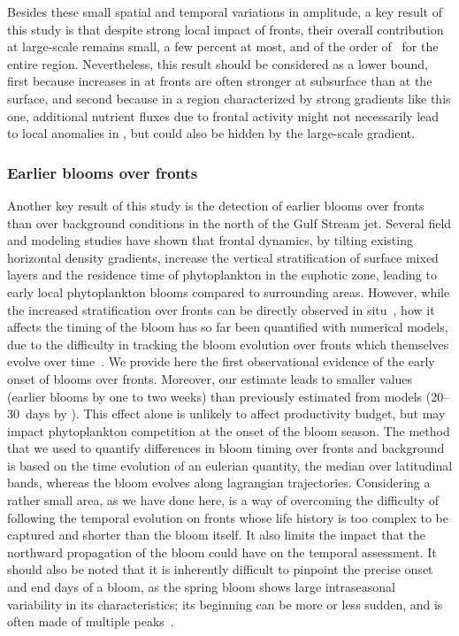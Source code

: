 Besides these small spatial and temporal variations in amplitude, a key result of this study is that despite strong local impact of fronts, their overall contribution at large-scale remains small, a few percent at most, and of the order of~ for the entire region.
Nevertheless, this result should be considered as a lower bound, first because increases in  at fronts are often stronger at subsurface than at the surface, and second because in a region characterized by strong gradients like this one, additional nutrient fluxes due to frontal activity might not necessarily lead to local anomalies in , but could also be hidden by the large-scale gradient.


\subsubsection{Earlier blooms over fronts}

Another key result of this study is the detection of earlier blooms over fronts than over background conditions in the north of the Gulf Stream jet.
Several field and modeling studies have shown that frontal dynamics, by tilting existing horizontal density gradients, increase the vertical stratification of surface mixed layers \parencite{taylor_2011} and the residence time of phytoplankton in the euphotic zone, leading to early local phytoplankton blooms compared to surrounding areas.
However, while the increased stratification over fronts can be directly observed in situ~\parencite{karleskind_2011, mahadevan_2012}, how it affects the timing of the bloom has so far been quantified with numerical models, due to the difficulty in tracking the bloom evolution over fronts which themselves evolve over time~\parencite{levy_2000, karleskind_2011, mahadevan_2012}.
We provide here the first observational evidence of the early onset of blooms over fronts.
Moreover, our estimate leads to smaller values (earlier blooms by one to two weeks) than previously estimated from models (20--30~days by \textcite{mahadevan_2012}).
This effect alone is unlikely to affect productivity budget, but may impact phytoplankton competition at the onset of the bloom season.
The method that we used to quantify differences in bloom timing over fronts and background is based on the time evolution of an eulerian quantity, the  median over latitudinal bands, whereas the bloom evolves along lagrangian trajectories.
Considering a rather small area, as we have done here, is a way of overcoming the difficulty of following the temporal evolution on fronts whose life history is too complex to be captured and shorter than the bloom itself.
It also limits the impact that the northward propagation of the bloom could have on the temporal assessment.
It should also be noted that it is inherently difficult to pinpoint the precise onset and end days of a bloom, as the spring bloom shows large intraseasonal variability in its characteristics; its beginning can be more or less sudden, and is often made of multiple peaks~\parencite{keerthi_2020}.


